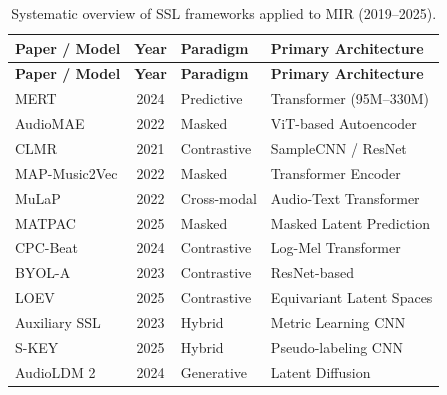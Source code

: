 \documentclass[12pt]{report}
\begin{document}
\begin{longtable}{@{} p{3.5cm} c l p{5cm} @{}}
\caption{Systematic overview of SSL frameworks applied to MIR (2019--2025).} \label{tab:sota_full} \\
\toprule
\textbf{Paper / Model} & \textbf{Year} & \textbf{Paradigm} & \textbf{Primary Architecture} \\ \midrule
\endfirsthead
\toprule
\textbf{Paper / Model} & \textbf{Year} & \textbf{Paradigm} & \textbf{Primary Architecture} \\ \midrule
\endhead
\bottomrule
\endfoot

MERT \cite{li_mert_2024} & 2024 & Predictive & Transformer (95M--330M) \\
AudioMAE \cite{AudioMAE2022} & 2022 & Masked & ViT-based Autoencoder \\
CLMR \cite{spijkervet_contrastive_2021} & 2021 & Contrastive & SampleCNN / ResNet \\
MAP-Music2Vec \cite{li_map-music2vec_2022} & 2022 & Masked & Transformer Encoder \\
MuLaP \cite{manco_learning_2022} & 2022 & Cross-modal & Audio-Text Transformer \\
MATPAC \cite{quelennec_matpac_2025} & 2025 & Masked & Masked Latent Prediction \\
CPC-Beat \cite{gagnere_contrastive_2024} & 2024 & Contrastive & Log-Mel Transformer \\
BYOL-A \cite{niizumi_byol_2023} & 2023 & Contrastive & ResNet-based \\
LOEV \cite{guinot_leave-one-equivariant_2025} & 2025 & Contrastive & Equivariant Latent Spaces \\
Auxiliary SSL \cite{akama_self-supervised_2023} & 2023 & Hybrid & Metric Learning CNN \\
S-KEY \cite{kong_s-key_2025} & 2025 & Hybrid & Pseudo-labeling CNN \\
AudioLDM 2 \cite{liu_audioldm_2024} & 2024 & Generative & Latent Diffusion \\
\bottomrule
\end{longtable}
\end{document}
